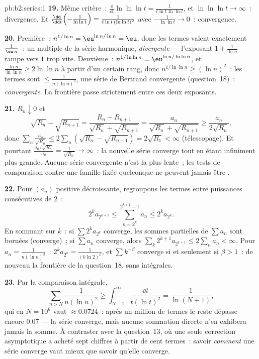\begin{solution}{pb:b2:series:1}
\textbf{19.} Même critère~: $\frac{\dd}{\dd t}\ln\ln\ln t =
\frac{1}{t\ln t\,\ln\ln t}$, et $\ln\ln\ln t \to \infty$~:
divergence. Et $\frac{\dd}{\dd t}\Bigl(-\frac1{\ln\ln t}\Bigr)
= \frac{1}{t\ln t\,(\ln\ln t)^2}$ avec $-\frac1{\ln\ln t} \to
0$~: convergence.

\textbf{20.} Première~: $n^{1/\ln n} = \eu^{\ln n/\ln n} = \eu$, donc
les termes valent exactement $\frac{1}{\eu\,n}$~: un multiple de la
série harmonique, \emph{divergente} --- l'exposant $1 +
\frac1{\ln n}$ rampe vers $1$ trop vite. Deuxième~: $n^{1/\ln\ln n}
= \eu^{\ln n/\ln\ln n}$, et $\frac{\ln n}{\ln\ln n} \geq
2\ln\ln n$ à partir d'un certain rang, donc $n^{1/\ln\ln n} \geq
(\ln n)^2$~: les termes sont $\leq \frac1{n(\ln n)^2}$, une série de
Bertrand convergente (question~18)~: \emph{convergente}. La frontière
passe strictement entre ces deux exposants.

\textbf{21.} $R_n \downarrow 0$ et
\[
\sqrt{R_n} - \sqrt{R_{n+1}} = \frac{R_n -
R_{n+1}}{\sqrt{R_n} + \sqrt{R_{n+1}}} =
\frac{a_n}{\sqrt{R_n} + \sqrt{R_{n+1}}} \geq
\frac{a_n}{2\sqrt{R_n}},
\]
donc $\sum_n \frac{a_n}{\sqrt{R_n}} \leq 2\sum_n(\sqrt{R_n} -
\sqrt{R_{n+1}}) = 2\sqrt{R_1} < \infty$ (télescopage). Et pourtant
$\frac{a_n/\sqrt{R_n}}{a_n} = \frac1{\sqrt{R_n}} \to \infty$~: la
nouvelle série converge tout en étant infiniment plus grande. Aucune
série convergente n'est la plus lente~; les tests de comparaison
contre une famille fixée quelconque ne peuvent jamais être .

\textbf{22.} Pour $(a_n)$ positive décroissante, regroupons les
termes entre puissances consécutives de $2$~:
\[
2^{k}a_{2^{k+1}} \leq \sum_{n=2^k}^{2^{k+1}-1} a_n \leq
2^ka_{2^k} .
\]
En sommant sur $k$~: si $\sum 2^ka_{2^k}$ converge, les sommes
partielles de $\sum a_n$ sont bornées (converge)~; si $\sum a_n$
converge, alors $\sum_k 2^{k+1}a_{2^{k+1}} \leq 2\sum_n a_n <
\infty$. Pour $a_n = \frac1{n(\ln n)^\beta}$~: $2^ka_{2^k} =
\frac{1}{(k\ln 2)^\beta}$, et $\sum k^{-\beta}$ converge si et
seulement si $\beta > 1$~: de nouveau la frontière de la question~18,
sans intégrales.

\textbf{23.} Par la comparaison intégrale,
\[
\sum_{n > N}\frac{1}{n(\ln n)^2} \geq
\int_{N+1}^{\infty}\frac{\dd t}{t(\ln t)^2} =
\frac{1}{\ln(N+1)},
\]
qui en $N = 10^6$ vaut $\approx 0.0724$~: après un million de termes
le reste dépasse encore $0.07$ --- la série converge, mais aucune
sommation directe n'en exhibera jamais la somme. À contraster avec la
question~13, où une seule correction asymptotique a acheté sept
chiffres à partir de cent termes~: savoir \emph{comment} une série
converge vaut mieux que savoir qu'elle converge.


\end{solution}

